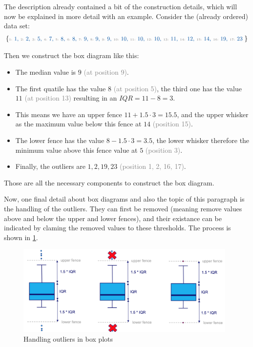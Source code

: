The description already contained a bit of the construction details, which will now be explained in more detail with an example. Consider the (already ordered) data set:
\begin{align*}
  \{
  \text{\textcolor{mathblue}{\small 
  {\tiny \color{gray} 1: }1, {\tiny \color{gray} 2: }2, {\tiny \color{gray} 3: }5, {\tiny \color{gray} 4: }7, {\tiny \color{gray} 5: }8, {\tiny \color{gray} 6: }8, {\tiny \color{gray} 7: }9, {\tiny \color{gray} 8: }9, {\tiny \color{gray} 9: }9, {\tiny \color{gray} 10: }10, {\tiny \color{gray} 11: }10, {\tiny \color{gray} 12: }10, {\tiny \color{gray} 13: }11, {\tiny \color{gray} 14: }12, {\tiny \color{gray} 15: }14, {\tiny \color{gray} 16: }19, {\tiny \color{gray} 17: }23 
  }}
  \}
\end{align*}
 
Then we construct the box diagram like this:
\begin{itemize}
  \item The median value is $9$ \textcolor{gray}{\tiny(at position 9)}.
  \item The first quatile has the value $8$ \textcolor{gray}{\tiny(at position 5)}, the third one has the value $11$ \textcolor{gray}{\tiny(at position 13)} resulting in an $IQR = 11-8 = 3$.
  \item This means we have an upper fence $11 + 1.5\cdot3 = 15.5$, and the upper whisker as the maximum value below this fence at $14$ \textcolor{gray}{\tiny(position 15)}.
  \item The lower fence has the value $8 - 1.5\cdot3 = 3.5$, the lower whisker therefore the minimum value above this fence value at $5$ \textcolor{gray}{\tiny(position 3)}.
  \item Finally, the outliers are $1, 2, 19, 23$ \textcolor{gray}{\tiny(position 1, 2, 16, 17)}.
\end{itemize}
Those are all the necessary components to construct the box diagram.

Now, one final detail about box diagrams and also the topic of this paragraph is the handling of the outliers. They can first be removed (meaning remove values above and below the upper and lower fences), and their existance can be indicated by claming the removed values to these thresholds. The process is shown in \ref{fig:2_box_plot_outlier_handling}.

\begin{figure}[h]
  \centering
  \includegraphics[height=4.5cm]{assets/visualization_and_extraction/box_outliers.png}
  \caption{Handling outliers in box plots}
  \label{fig:2_box_plot_outlier_handling}
\end{figure}